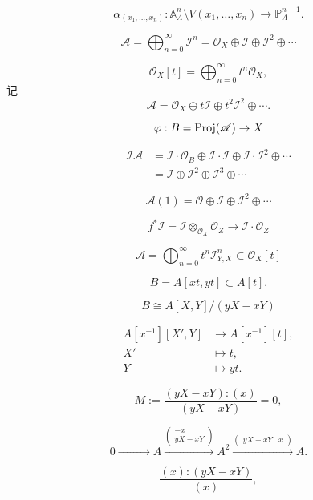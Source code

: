 \[
	\alpha_{(x_1,\dots,x_n)}:\mathbb A_A^n\setminus V(x_1,\dots,x_n)\longrightarrow \mathbb P_A^{n-1}.
\]


\[
	\mathscr A=\bigoplus_{n=0}^\infty \mathscr I^n=\mathscr O_X\oplus \mathscr I\oplus \mathscr I^2\oplus \cdots
\]

\[
	\mathscr O_X[t]=\bigoplus_{n=0}^\infty t^n\mathscr O_X,
\]
记
\[
	\mathscr A=\mathscr O_X\oplus t\mathscr I\oplus t^2\mathscr I^2\oplus \cdots.
\]

\[
	\varphi:B=\operatorname{Proj}(\mathscr A)\to X
\]

\[
	\begin{aligned}
	\mathscr I\mathscr A&=\mathscr I\cdot \mathscr O_B\oplus \mathscr I\cdot \mathscr I\oplus \mathscr I\cdot \mathscr I^2 \oplus \cdots\\
	&=\mathscr I\oplus \mathscr I^2 \oplus \mathscr I^3\oplus \cdots
	\end{aligned}
\]

\[
	\mathscr A(1)=\mathscr O\oplus \mathscr I \oplus \mathscr I^2\oplus \cdots
\]


\[
	f^*\mathscr I=\mathscr I\otimes_{\mathscr O_X}\mathscr O_Z\to \mathscr I\cdot \mathscr O_Z
\]

\[
	\mathscr A=\bigoplus_{n=0}^\infty t^n\mathscr I_{Y,X}^n\subset \mathscr O_X[t]
\]


\[
	B=A[xt,yt]\subset A[t].
\]

\[
	B\cong A[X,Y]/(yX-xY)
\]

\[
	\begin{aligned}
		A[x^{-1}][X',Y] & \longrightarrow A[x^{-1}][t],\\
		X' &\longmapsto t,\\
		Y  &\longmapsto yt.
	\end{aligned}
\]

\[
	M:=\frac{(yX-xY):(x)}{(yX-xY)}=0,
\]

\[
	0\xrightarrow{\qquad\quad\quad} A \xrightarrow{
	\begin{pmatrix}
		-x\\ yX-xY
	\end{pmatrix}}A^2
	\xrightarrow{\begin{pmatrix}
		yX-xY& x
	\end{pmatrix}}A.
\]

\[
	\frac{(x):(yX-xY)}{(x)},
\]


